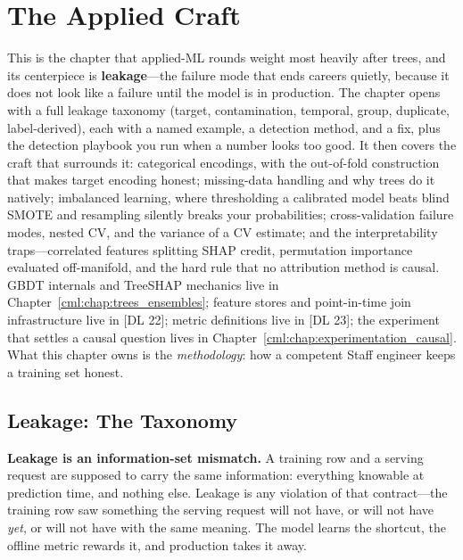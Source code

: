 \chapter{The Applied Craft}
\label{cml:chap:applied_craft}

\begin{tldr}
This is the chapter that applied-ML rounds weight most heavily after trees, and its centerpiece is \textbf{leakage}---the failure mode that ends careers quietly, because it does not look like a failure until the model is in production. The chapter opens with a full leakage taxonomy (target, contamination, temporal, group, duplicate, label-derived), each with a named example, a detection method, and a fix, plus the detection playbook you run when a number looks too good. It then covers the craft that surrounds it: categorical encodings, with the out-of-fold construction that makes target encoding honest; missing-data handling and why trees do it natively; imbalanced learning, where thresholding a calibrated model beats blind SMOTE and resampling silently breaks your probabilities; cross-validation failure modes, nested CV, and the variance of a CV estimate; and the interpretability traps---correlated features splitting SHAP credit, permutation importance evaluated off-manifold, and the hard rule that no attribution method is causal. GBDT internals and TreeSHAP mechanics live in Chapter~\ref{cml:chap:trees_ensembles}; feature stores and point-in-time join infrastructure live in [DL 22]; metric definitions live in [DL 23]; the experiment that settles a causal question lives in Chapter~\ref{cml:chap:experimentation_causal}. What this chapter owns is the \emph{methodology}: how a competent Staff engineer keeps a training set honest.
\end{tldr}

\section{Leakage: The Taxonomy}
\label{cml:sec:leakage}

\textbf{Leakage is an information-set mismatch.} A training row and a serving request are supposed to carry the same information: everything knowable at prediction time, and nothing else. Leakage is any violation of that contract---the training row saw something the serving request will not have, or will not have \emph{yet}, or will not have with the same meaning. The model learns the shortcut, the offline metric rewards it, and production takes it away.

